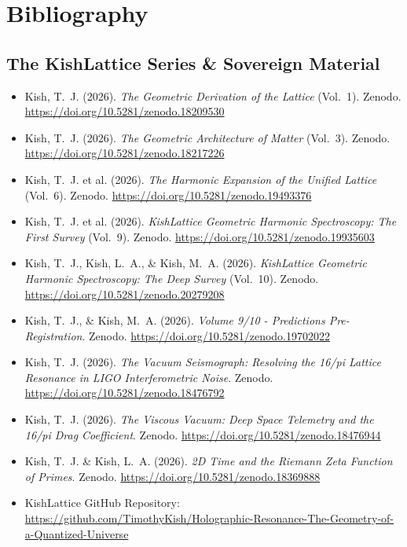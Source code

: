 \documentclass[11pt, letterpaper, openany]{book}
\begin{document}
\chapter*{Bibliography}

\section*{The KishLattice Series \& Sovereign Material}
\begin{itemize}
    \item Kish, T.~J. (2026). \textit{The Geometric Derivation of the Lattice} (Vol.~1). Zenodo. \url{https://doi.org/10.5281/zenodo.18209530}
    \item Kish, T.~J. (2026). \textit{The Geometric Architecture of Matter} (Vol.~3). Zenodo. \url{https://doi.org/10.5281/zenodo.18217226}
    \item Kish, T.~J. et al. (2026). \textit{The Harmonic Expansion of the Unified Lattice} (Vol.~6). Zenodo. \url{https://doi.org/10.5281/zenodo.19493376}
    \item Kish, T.~J. et al. (2026). \textit{KishLattice Geometric Harmonic Spectroscopy: The First Survey} (Vol.~9). Zenodo. \url{https://doi.org/10.5281/zenodo.19935603}
    \item Kish, T.~J., Kish, L.~A., \& Kish, M.~A. (2026). \textit{KishLattice Geometric Harmonic Spectroscopy: The Deep Survey} (Vol.~10). Zenodo. \url{https://doi.org/10.5281/zenodo.20279208}
    \item Kish, T.~J., \& Kish, M.~A. (2026). \textit{Volume 9/10 - Predictions Pre-Registration}. Zenodo. \url{https://doi.org/10.5281/zenodo.19702022}
    \item Kish, T.~J. (2026). \textit{The Vacuum Seismograph: Resolving the 16/pi Lattice Resonance in LIGO Interferometric Noise}. Zenodo. \url{https://doi.org/10.5281/zenodo.18476792}
    \item Kish, T.~J. (2026). \textit{The Viscous Vacuum: Deep Space Telemetry and the 16/pi Drag Coefficient}. Zenodo. \url{https://doi.org/10.5281/zenodo.18476944}
    \item Kish, T.~J. \& Kish, L.~A. (2026). \textit{2D Time and the Riemann Zeta Function of Primes}. Zenodo. \url{https://doi.org/10.5281/zenodo.18369888}
    \item KishLattice GitHub Repository: \url{https://github.com/TimothyKish/Holographic-Resonance-The-Geometry-of-a-Quantized-Universe}
\end{itemize}
\end{document}
